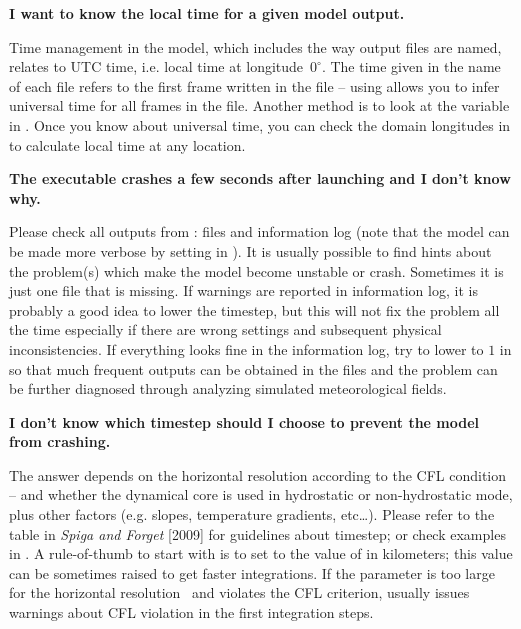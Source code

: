 \sk
\noindent \textbf{I want to know the local time for a given model output.}
\begin{finger}
\item Time management in the model, which includes the way output files are named, relates to UTC time, i.e. local time at longitude~$0^{\circ}$. The time given in the name of each  file refers to the first frame written in the file -- using  allows you to infer universal time for all frames in the file. Another method is to look at the variable  in . Once you know about universal time, you can check the domain longitudes in  to calculate local time at any location.
\end{finger}

\sk
\noindent \textbf{The executable  crashes a few seconds after launching and I don't know why.}
\begin{finger}
\item Please check all outputs from :  files and information log (note that the model can be made more verbose by setting  in ). It is usually possible to find hints about the problem(s) which make the model become unstable or crash. Sometimes it is just one file that is missing. If  warnings are reported in information log, it is probably a good idea to lower the timestep, but this will not fix the problem all the time especially if there are wrong settings and subsequent physical inconsistencies. If everything looks fine in the information log, try to lower  to $1$ in  so that much frequent outputs can be obtained in the  files and the problem can be further diagnosed through analyzing simulated meteorological fields.
\end{finger}

\sk
\noindent \textbf{I don't know which timestep should I choose to prevent the model from crashing.}
\begin{finger}
\item The answer depends on the horizontal resolution according to the CFL condition -- and whether the dynamical core is used in hydrostatic or non-hydrostatic mode, plus other factors (e.g. slopes, temperature gradients, etc\ldots). Please refer to the table in \textit{Spiga and Forget} [2009] for guidelines about timestep; or check examples in . A rule-of-thumb to start with is to set  to the value of  in kilometers; this value can be sometimes raised to get faster integrations. If the  parameter is too large for the horizontal resolution~ and violates the CFL criterion,  usually issues warnings about CFL violation in the first integration steps. 
\end{finger}

